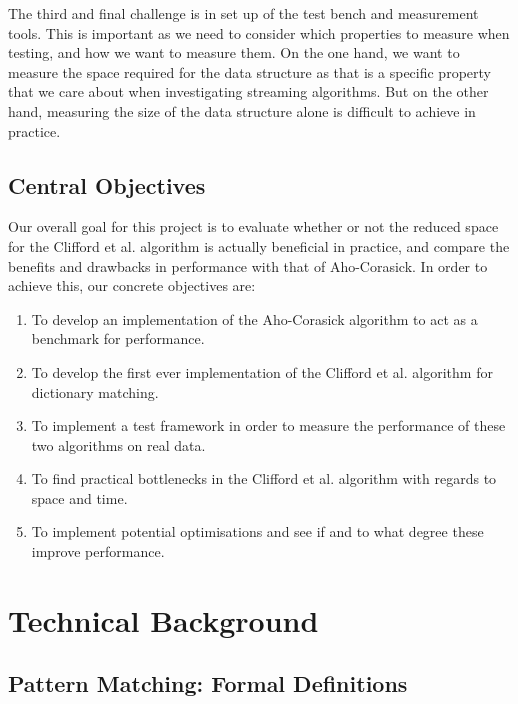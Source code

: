 \documentclass[ %
                    author={Dominic Joseph Moylett},
                    degree={MEng},
                     title={Dictionary Matching with Fingerprints},
                  subtitle={An Empirical Analysis},
                      type={research},
                      year={2015} ]{dissertation}
\begin{document}
The third and final challenge is in set up of the test bench and measurement tools. This is important as we need to consider which properties to measure when testing, and how we want to measure them. On the one hand, we want to measure the space required for the data structure as that is a specific property that we care about when investigating streaming algorithms. But on the other hand, measuring the size of the data structure alone is difficult to achieve in practice.

\section{Central Objectives}
\label{sec:objectives}

Our overall goal for this project is to evaluate whether or not the reduced space for the Clifford et al. algorithm is actually beneficial in practice, and compare the benefits and drawbacks in performance with that of Aho-Corasick. In order to achieve this, our concrete objectives are:

\begin{enumerate}
  \item To develop an implementation of the Aho-Corasick algorithm to act as a benchmark for performance.
  \item To develop the first ever implementation of the Clifford et al. algorithm for dictionary matching.
  \item To implement a test framework in order to measure the performance of these two algorithms on real data.
  \item To find practical bottlenecks in the Clifford et al. algorithm with regards to space and time.
  \item To implement potential optimisations and see if and to what degree these improve performance.
\end{enumerate}


\chapter{Technical Background}
\label{chap:technical}

\section{Pattern Matching: Formal Definitions}
\end{document}
